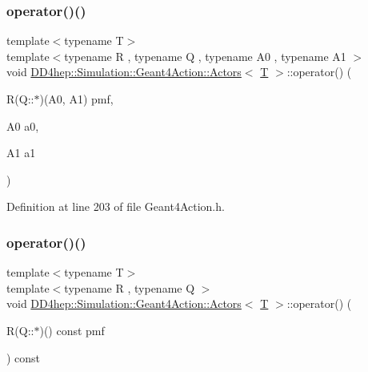 \subsubsection{\texorpdfstring{operator()()}{operator()()}\hspace{0.1cm}{\footnotesize\ttfamily [3/6]}}
{\footnotesize\ttfamily template$<$typename T$>$ \\
template$<$typename R , typename Q , typename A0 , typename A1 $>$ \\
void \hyperlink{class_d_d4hep_1_1_simulation_1_1_geant4_action_1_1_actors}{D\+D4hep\+::\+Simulation\+::\+Geant4\+Action\+::\+Actors}$<$ \hyperlink{class_t}{T} $>$\+::operator() (\begin{DoxyParamCaption}\item[{R(Q\+::$\ast$)(A0, A1)}]{pmf,  }\item[{A0}]{a0,  }\item[{A1}]{a1 }\end{DoxyParamCaption})\hspace{0.3cm}{\ttfamily [inline]}}



Definition at line 203 of file Geant4\+Action.\+h.

\hypertarget{class_d_d4hep_1_1_simulation_1_1_geant4_action_1_1_actors_a558fcf4dc925660c9946011dff801c99}{}\label{class_d_d4hep_1_1_simulation_1_1_geant4_action_1_1_actors_a558fcf4dc925660c9946011dff801c99} 
\subsubsection{\texorpdfstring{operator()()}{operator()()}\hspace{0.1cm}{\footnotesize\ttfamily [4/6]}}
{\footnotesize\ttfamily template$<$typename T$>$ \\
template$<$typename R , typename Q $>$ \\
void \hyperlink{class_d_d4hep_1_1_simulation_1_1_geant4_action_1_1_actors}{D\+D4hep\+::\+Simulation\+::\+Geant4\+Action\+::\+Actors}$<$ \hyperlink{class_t}{T} $>$\+::operator() (\begin{DoxyParamCaption}\item[{R(Q\+::$\ast$)() const}]{pmf }\end{DoxyParamCaption}) const\hspace{0.3cm}{\ttfamily [inline]}}



